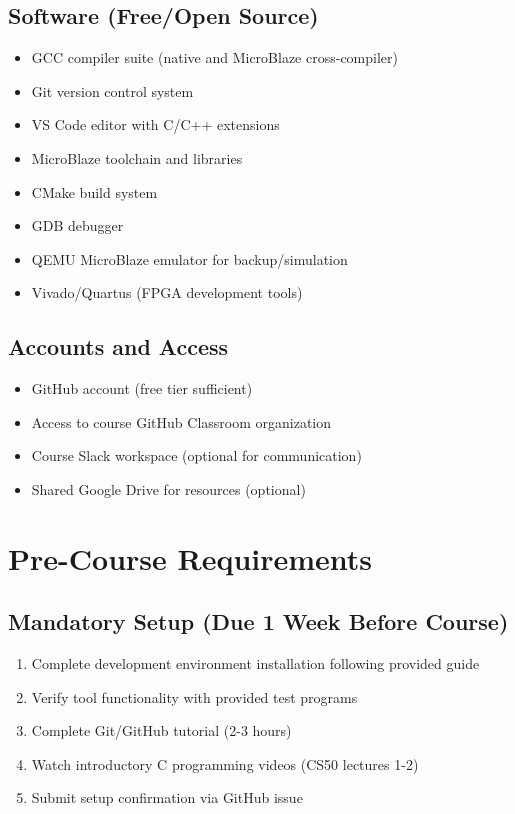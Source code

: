 \documentclass[11pt,a4paper]{article}
\begin{document}
\subsection{Software (Free/Open Source)}
\begin{itemize}
    \item GCC compiler suite (native and MicroBlaze cross-compiler)
    \item Git version control system
    \item VS Code editor with C/C++ extensions
    \item MicroBlaze toolchain and libraries
    \item CMake build system
    \item GDB debugger
    \item QEMU MicroBlaze emulator for backup/simulation
    \item Vivado/Quartus (FPGA development tools)
\end{itemize}

\subsection{Accounts and Access}
\begin{itemize}
    \item GitHub account (free tier sufficient)
    \item Access to course GitHub Classroom organization
    \item Course Slack workspace (optional for communication)
    \item Shared Google Drive for resources (optional)
\end{itemize}

\section{Pre-Course Requirements}

\subsection{Mandatory Setup (Due 1 Week Before Course)}
\begin{enumerate}
    \item Complete development environment installation following provided guide
    \item Verify tool functionality with provided test programs
    \item Complete Git/GitHub tutorial (2-3 hours)
    \item Watch introductory C programming videos (CS50 lectures 1-2)
    \item Submit setup confirmation via GitHub issue
\end{enumerate}
\end{document}
